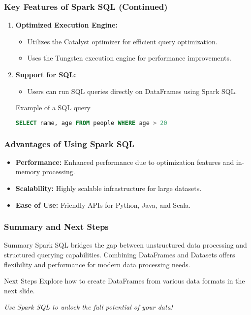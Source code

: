 \documentclass[aspectratio=169]{beamer}
\begin{document}
\begin{frame}[fragile]
    \frametitle{Key Features of Spark SQL (Continued)}
    \begin{enumerate}[resume]
        \item \textbf{Optimized Execution Engine:}
        \begin{itemize}
            \item Utilizes the Catalyst optimizer for efficient query optimization.
            \item Uses the Tungsten execution engine for performance improvements.
        \end{itemize}
        
        \item \textbf{Support for SQL:}
        \begin{itemize}
            \item Users can run SQL queries directly on DataFrames using Spark SQL.
        \end{itemize}
        
        \begin{block}{Example of a SQL query}
            \begin{lstlisting}[language=sql]
            SELECT name, age FROM people WHERE age > 20
            \end{lstlisting}
        \end{block}
    \end{enumerate}
\end{frame}

\begin{frame}[fragile]
    \frametitle{Advantages of Using Spark SQL}
    \begin{itemize}
        \item \textbf{Performance:} Enhanced performance due to optimization features and in-memory processing.
        \item \textbf{Scalability:} Highly scalable infrastructure for large datasets.
        \item \textbf{Ease of Use:} Friendly APIs for Python, Java, and Scala.
    \end{itemize}
\end{frame}

\begin{frame}[fragile]
    \frametitle{Summary and Next Steps}
    \begin{block}{Summary}
        Spark SQL bridges the gap between unstructured data processing and structured querying capabilities. Combining DataFrames and Datasets offers flexibility and performance for modern data processing needs.
    \end{block}
    
    \begin{block}{Next Steps}
        Explore how to create DataFrames from various data formats in the next slide.
    \end{block}
    
    \begin{center}
        \textit{Use Spark SQL to unlock the full potential of your data!}
    \end{center}
\end{frame}
\end{document}
